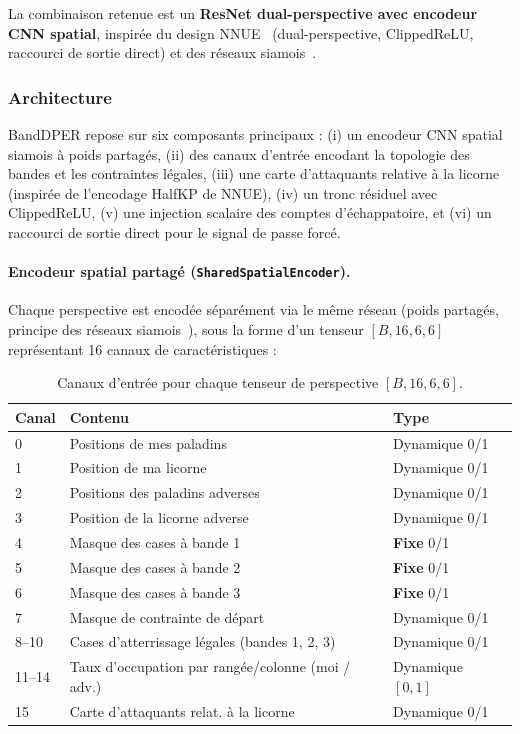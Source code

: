 \documentclass[12pt,a4paper]{article}
\begin{document}
La combinaison retenue est un \textbf{ResNet dual-perspective avec encodeur CNN spatial}, inspirée du design NNUE~\cite{cp_nnue} (dual-perspective, ClippedReLU, raccourci de sortie direct) et des réseaux siamois~\cite{bromley1993}.

\subsubsection*{Architecture}

BandDPER repose sur six composants principaux : (i) un encodeur CNN spatial siamois à poids partagés, (ii) des canaux d'entrée encodant la topologie des bandes et les contraintes légales, (iii) une carte d'attaquants relative à la licorne (inspirée de l'encodage HalfKP de NNUE), (iv) un tronc résiduel avec ClippedReLU, (v) une injection scalaire des comptes d'échappatoire, et (vi) un raccourci de sortie direct pour le signal de passe forcé.

\paragraph{Encodeur spatial partagé (\texttt{SharedSpatialEncoder}).}
Chaque perspective est encodée séparément via le même réseau (poids partagés, principe des réseaux siamois~\cite{bromley1993}), sous la forme d'un tenseur $[B, 16, 6, 6]$ représentant 16 canaux de caractéristiques :

\begin{table}[H]
\centering
\begin{tabular}{p{1.0cm} p{5.8cm} p{2.5cm}}
\toprule
Canal & Contenu & Type \\
\midrule
0 & Positions de mes paladins & Dynamique 0/1 \\
1 & Position de ma licorne & Dynamique 0/1 \\
2 & Positions des paladins adverses & Dynamique 0/1 \\
3 & Position de la licorne adverse & Dynamique 0/1 \\
4 & Masque des cases à bande 1 & \textbf{Fixe} 0/1 \\
5 & Masque des cases à bande 2 & \textbf{Fixe} 0/1 \\
6 & Masque des cases à bande 3 & \textbf{Fixe} 0/1 \\
7 & Masque de contrainte de départ & Dynamique 0/1 \\
8--10 & Cases d'atterrissage légales (bandes 1, 2, 3) & Dynamique 0/1 \\
11--14 & Taux d'occupation par rangée/colonne (moi / adv.) & Dynamique $[0,1]$ \\
15 & Carte d'attaquants relat. à la licorne & Dynamique 0/1 \\
\bottomrule
\end{tabular}
\caption{Canaux d'entrée pour chaque tenseur de perspective $[B, 16, 6, 6]$.}
\label{tab:input-channels}
\end{table}
\end{document}
